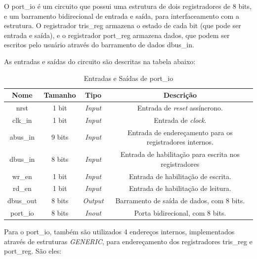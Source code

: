 \documentclass{article}
\begin{document}
O port\_io  é um circuito que possui uma estrutura de dois registradores de 8 bits, e um barramento bidirecional de entrada e saída, para interfaceamento com a estrutura. O registrador tris\_reg armazena o estado de cada bit (que pode ser entrada e saída), e o registrador port\_reg armazena dados, que podem ser escritos pelo usuário através do barramento de dados dbus\_in.

As entradas e saídas do circuito são descritas na tabela abaixo:\\

\begin{table}[ht]
    \begin{center}
        \begin{tabular}{|c|c|c|c|}
            \hline
            Nome & Tamanho & Tipo & Descrição\\
            \hline
            nrst & 1 bit & \textit{Input} & Entrada de \textit{reset} assíncrono.\\
            \hline
            clk\_in & 1 bit & \textit{Input} & Entrada de \textit{clock}.\\
            \hline
            abus\_in & 9 bits & \textit{Input} & Entrada de endereçamento para os registradores internos.\\
            \hline
            dbus\_in & 8 bits & \textit{Input} & Entrada de habilitação para escrita nos registradores\\
            \hline
            wr\_en & 1 bit & \textit{Input} & Entrada de habilitação de escrita.\\
            \hline
            rd\_en & 1 bit & \textit{Input} & Entrada de habilitação de leitura.\\
            \hline
            dbus\_out & 8 bits & \textit{Output} & Barramento de saída de dados, com 8 bits.\\
            \hline
            port\_io & 8 bits & \textit{Inout} & Porta bidirecional, com 8 bits.\\
            \hline
        \end{tabular}
    \end{center}
    \caption{Entradas e Saídas de port\_io}
\end{table}

Para o port\_io, também são utilizados 4 endereços internos, implementados através de estruturas \textit{GENERIC}, para endereçamento dos registradores tris\_reg e port\_reg. São eles:
\end{document}
